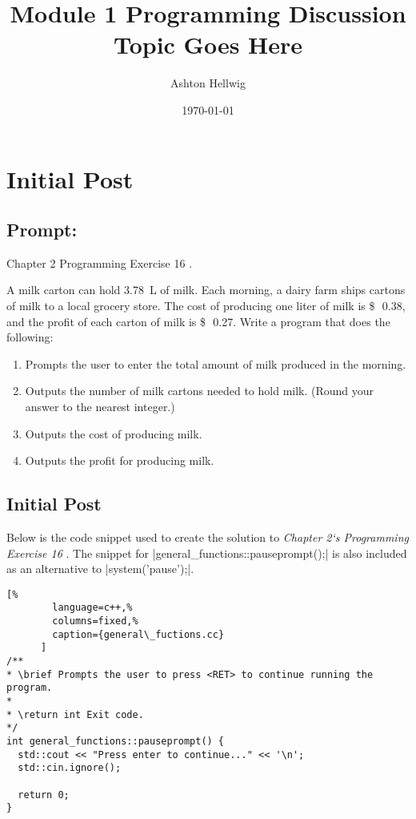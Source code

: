 \documentclass[a4paper, 12pt]{article}
\title{%
    Module 1 Programming Discussion\\%
    \large{Topic Goes Here}
  }
\author{Ashton Hellwig}
\date\today
\newcommand{\usd}[1]{\SI{#1}[\$\ensuremath{\,}]{}}
\begin{document}
  \maketitle
  \tableofcontents
  \listofalgorithms
  \newpage

  \section{Initial Post}
    \subsection{Prompt:}
      Chapter 2 Programming Exercise 16 \parencite[~\S2-16c]{textbook}.
      \begin{mdframed}[style=AnswerFrame,nobreak=true,align=center]
        A milk carton can hold \SI{3.78}{\liter} of milk. Each morning, a dairy
          farm ships cartons of milk to a local grocery store. The cost of
          producing one liter of milk is \usd{0.38}, and the profit of each
          carton of milk is \usd{0.27}. Write a program that does the following:

        \begin{enumerate}[label=\alph*.]
          \item Prompts the user to enter the total amount of milk produced in
            the morning.
          \item Outputs the number of milk cartons needed to hold milk.
            (Round your answer to the nearest integer.)
          \item Outputs the cost of producing milk.
          \item Outputs the profit for producing milk.
        \end{enumerate}
      \end{mdframed}

    \subsection{Initial Post}
      Below is the code snippet used to create the solution to \textit{Chapter
        2`s Programming Exercise 16} \parencite[~\S2-16c]{textbook}. The snippet
        for |general_functions::pauseprompt();| is also included as an
        alternative to |system('pause');|.

      \begin{lstlisting}[%
        language=c++,%
        columns=fixed,%
        caption={general\_fuctions.cc}
      ]
/**
* \brief Prompts the user to press <RET> to continue running the program.
*
* \return int Exit code.
*/
int general_functions::pauseprompt() {
  std::cout << "Press enter to continue..." << '\n';
  std::cin.ignore();

  return 0;
}
      \end{lstlisting}
\end{document}
